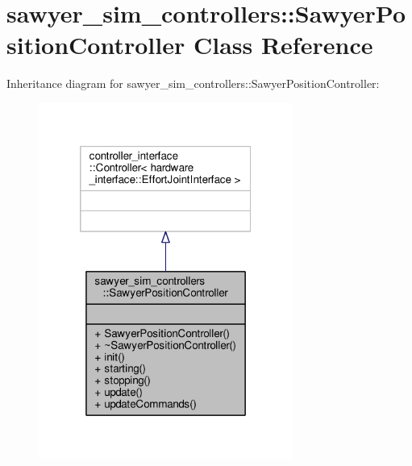 \hypertarget{classsawyer__sim__controllers_1_1_sawyer_position_controller}{\section{sawyer\-\_\-sim\-\_\-controllers\-:\-:Sawyer\-Position\-Controller Class Reference}
\label{classsawyer__sim__controllers_1_1_sawyer_position_controller}
}


Inheritance diagram for sawyer\-\_\-sim\-\_\-controllers\-:\-:Sawyer\-Position\-Controller\-:
\nopagebreak
\begin{figure}[H]
\begin{center}
\leavevmode
\includegraphics[width=236pt]{classsawyer__sim__controllers_1_1_sawyer_position_controller__inherit__graph}
\end{center}
\end{figure}


